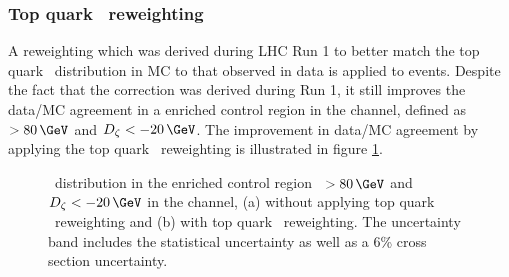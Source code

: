 \subsubsection*{Top quark \pT~reweighting}
A reweighting which was derived during \ac{LHC} Run 1
to better match the top quark \pT~distribution in \ac{MC}
to that observed in data is applied to \ttbar events. Despite
the fact that the correction was derived during Run 1, it still
improves the data/\ac{MC} agreement in a \ttbar enriched
control region in the \emu channel, defined as 
\MET~$>80\,\GeV$ and $D_{\zeta}<-20\,\GeV$. The improvement in data/\ac{MC} agreement
by applying the top quark \pT~reweighting is illustrated in figure \ref{fig:mssm_corrs_toppt}.
\begin{figure}[h!]
\begin{center}
\end{center}
\caption[\mTtot~distribution in the \ttbar
enriched control region, with and without applying top quark \pT~reweighting.]{\mTtot~distribution in the \ttbar enriched control region \MET~$>80\,\GeV$ and $D_{\zeta}<-20\,\GeV$ in the \emu channel,
(a) without applying top quark \pT~reweighting and (b) with top quark \pT~reweighting.
The uncertainty band includes the statistical uncertainty as well as a 6\% \ttbar cross section uncertainty.}
\label{fig:mssm_corrs_toppt}
\end{figure}

